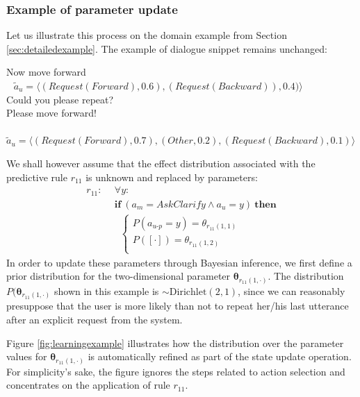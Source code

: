 \subsubsection*{Example of parameter update}

Let us illustrate this process on the domain example from Section \ref{sec:detailedexample}.  The example of dialogue snippet remains unchanged:
 \begin{dialogue} 
 Now move forward \\ $\phantom{b}$ $\tilde{a}_u = \langle (\mathit{Request(Forward)}, 0.6), (\mathit{Request(Backward)}), 0.4)\rangle$  \\[-3mm]
 Could you please repeat? \\[-3mm]
 Please move forward! \\ $\phantom{b}$ $\tilde{a}_u = \langle (\mathit{Request(Forward)}, 0.7), (\mathit{Other}, 0.2), (\mathit{Request(Backward)}, 0.1) \rangle$ \\[-4mm]
\end{dialogue}

We shall however assume that the effect distribution associated with the predictive rule $r_{11}$ is unknown and replaced by parameters: 
\begin{align*}
r_{11}: \ \ & \forall y: \\ 
& \textbf{if} \ (a_m = \mathit{AskClarify} \land a_u=y) \ \textbf{then} \\ 
& \; \;  \begin{cases} 
P(a_{u\mbox{-}p} = y) = \theta_{r_{11}(1,1)} \\ 
P([\cdot]) = \theta_{r_{11}(1,2)} \\ 
\end{cases}
\end{align*}
In order to update these parameters through Bayesian inference, we first define a prior distribution for the two-dimensional parameter $\boldsymbol\theta_{r_{11}(1,\cdot)}$.  The distribution $P(\boldsymbol\theta_{r_{11}(1,\cdot)}$ shown in this example is $\sim \mathrm{Dirichlet}(2,1)$, since we can reasonably presuppose that the user is more likely than not to repeat her/his last utterance after an explicit request from the system.

Figure \ref{fig:learningexample} illustrates how the distribution over the parameter values for $\boldsymbol\theta_{r_{11}(1,\cdot)}$ is automatically refined as part of the state update operation.  For simplicity's sake, the figure ignores the steps related to action selection and concentrates on the application of rule $r_{11}$.  

